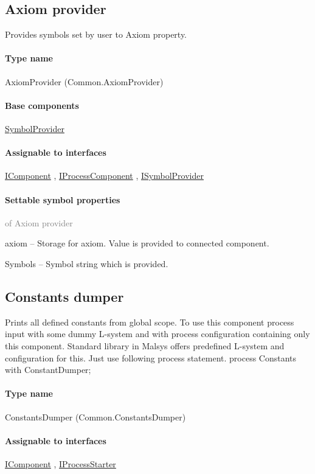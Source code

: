 
\subsection{Axiom provider}
\label{Malsys.Processing.Components.Common.AxiomProvider}
Provides symbols set by user to Axiom property.\paragraph{Type name}
AxiomProvider (Common.AxiomProvider) 	\paragraph{Base components}
		\hyperref[Malsys.Processing.Components.Common.SymbolProvider]{SymbolProvider}%
	\paragraph{Assignable to interfaces}
		\hyperref[Malsys.Processing.Components.IComponent]{IComponent}%
, 		\hyperref[Malsys.Processing.Components.IProcessComponent]{IProcessComponent}%
, 		\hyperref[Malsys.Processing.Components.ISymbolProvider]{ISymbolProvider}%
	\paragraph{Settable symbol properties}\textcolor{gray}{of Axiom provider}
	\begin{description*}
		\item[axiom]
			-- Storage for axiom.
            Value is provided to connected component.
		\item[Symbols]
			-- Symbol string which is provided.
	\end{description*}
	

\subsection{Constants dumper}
\label{Malsys.Processing.Components.Common.ConstantsDumper}
Prints all defined constants from global scope.
            To use this component process input with some dummy L-system and
            with process configuration containing only this component.
            Standard library in Malsys offers predefined L-system and configuration for this.
            Just use following process statement.
            process Constants with ConstantDumper;\paragraph{Type name}
ConstantsDumper (Common.ConstantsDumper) 	\paragraph{Assignable to interfaces}
		\hyperref[Malsys.Processing.Components.IComponent]{IComponent}%
, 		\hyperref[Malsys.Processing.Components.IProcessStarter]{IProcessStarter}%

